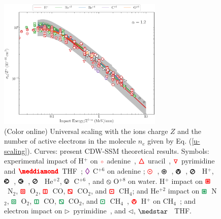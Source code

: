 \documentclass[10pt,showpacs,showkeys,twocolumn]{revtex4}
\begin{document}
\begin{figure}[!t]%
\centering
\includegraphics[width=0.7\textwidth]{zmol_werror.eps}
\caption{(Color online) Universal scaling with the ions charge $Z$ and 
the number of active electrons in the molecule $n_e$ given by 
Eq. (\ref{u-scaling}). Curves: present CDW-SSM theoretical results. 
Symbols: experimental impact of H$^+$ on 
\mbox{\LARGE$\color{red}\circ$} adenine~\cite{iriki2011}, 
{\fontsize{11}{20}$\color{red}\pmb{\triangle}$} uracil~\cite{itoh2013}, 
{\fontsize{11}{20}$\color{red}\pmb{\triangledown}$} pyrimidine~\cite{wolff2014} and 
{\fontsize{10}{20}$\color{red}\pmb{\meddiamond}$} THF~\cite{wang2016};
{\fontsize{11}{20}$\color{Purple}\pmb{\lozenge}$} C$^{+6}$ on adenine \cite{tribedi2019};
\mbox{\fontsize{11}{20}$\color{red}\pmb{\odot}$}~\cite{Luna2007}, 
{\fontsize{11}{20}\color{red}$\pmb{\logof}$}~\cite{Rudd86}, 
{\fontsize{11}{20}\color{red}$\pmb{\varowedge}$}~\cite{pRudd85}, 
{\fontsize{11}{20}\color{red}$\pmb{\varoslash}$}~\cite{toburen80} H$^+$,
{\fontsize{11}{20}\color{ForestGreen}$\pmb{\varolessthan}$}~\cite{Ohsawa05},
{\fontsize{11}{20}\color{ForestGreen}$\pmb{\varogreaterthan}$}~\cite{Rudd85},
{\fontsize{11}{20}\color{ForestGreen}$\pmb{\varoslash}$}~\cite{toburen80} He$^{+2}$,
{\fontsize{11}{20}\color{Purple}$\pmb{\ovee}$}~C$^{+6}$ \cite{DalCappello2009,Bhattacharjee17}, and 
{\fontsize{11}{20}\color{BurntOrange}$\pmb{\obslash}$}
O$^{+8}$ \cite{Tribedi_O_water} on water.
H$^{+}$ impact on 
{\fontsize{11}{20}${\color{red}\pmb{\boxast}}$}~N$_2$, 
{\fontsize{11}{20}${\color{red}\pmb{\boxbox}}$}~O$_2$, 
{\fontsize{11}{20}${\color{red}\pmb{\boxbar}}$}~CO, 
{\fontsize{11}{20}${\color{red}\pmb{\boxbslash}}$}~CO$_2$, and
{\fontsize{11}{20}${\color{red}\pmb{\boxdot}}$}~CH$_4$; 
and He$^{+2}$ impact on 
{\fontsize{11}{20}${\color{ForestGreen}\pmb{\boxast}}$}~N$_2$,
{\fontsize{11}{20}${\color{ForestGreen}\pmb{\boxbox}}$}~O$_2$, 
{\fontsize{11}{20}${\color{ForestGreen}\pmb{\boxbar}}$}~CO, 
{\fontsize{11}{20}${\color{ForestGreen}\pmb{\boxbslash}}$}~CO$_2$, and
{\fontsize{11}{20}${\color{ForestGreen}\pmb{\boxdot}}$}~CH$_4$~\cite{Rudd85,Rudd1983}, 
{\fontsize{11}{20}${\color{red}\pmb{\varowedge}}$}~H$^{+}$ on CH$_4$~\cite{Luna2019}; 
and electron impact on $\rhd$~pyrimidine~\cite{bug2017}, and $\lhd$, $\medstar$~\cite{wolf2019,fuss2009} THF.}
\label{fig:zalpha}
\end{figure} 
 
\end{document}
